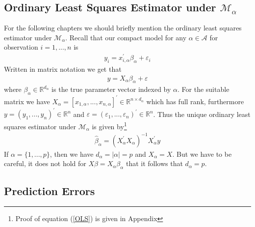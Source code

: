 \documentclass[Research_Module_ES.tex]{subfiles}
\begin{document}
\subsection{Ordinary Least Squares Estimator under $\mathcal{M}_\alpha$}
For the following chapters we should briefly mention the ordinary least squares estimator under $\mathcal{M}_\alpha$. Recall that our compact model for any $\alpha\in\mathcal{A}$ for observation $i=1,...,n$ is
\begin{align*}
	y_i=x_{i,\alpha}^\prime\beta_\alpha+\varepsilon_i
\end{align*}
Written in matrix notation we get that
\begin{align}
	y=X_\alpha \beta_\alpha+\varepsilon  \label{CM_model_matrix}
\end{align}
where $\beta_\alpha\in\mathbb{R}^{d_\alpha}$ is the true parameter vector indexed by $\alpha$. For the suitable matrix we have $X_\alpha=[x_{1,\alpha},...,x_{n,\alpha}]^\prime \in\mathbb{R}^{n\times d_\alpha}$
which has full rank, furthermore $y=(y_1,...,y_n)^\prime\in\mathbb{R}^n$ and $\varepsilon=(\varepsilon_1,...,\varepsilon_n)^\prime\in\mathbb{R}^n$. Thus the unique %
ordinary least squares estimator under $\mathcal{M}_\alpha$ is given by\footnote{Proof of equation (\ref{OLS}) is given in Appendix }
\begin{align}
	\hat{\beta}_\alpha=(X_\alpha^\prime X_\alpha)^{-1}X_\alpha^\prime y
	\label{OLS}
\end{align}
If $\alpha=\{1,...,p\}$, then we have $d_\alpha=|\alpha|=p$ and $X_\alpha=X$. But we have to be careful, it does not hold for $X\beta=X_\alpha\beta_\alpha$ that it follows that $d_\alpha=p$.

\subsection{Prediction Errors}
\end{document}
